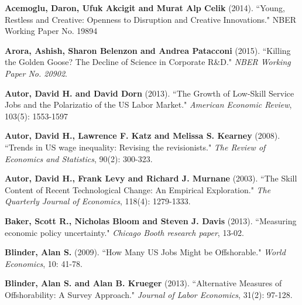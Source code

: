 \documentclass[11pt,a4paper,fleqn]{article}
\begin{document}
\vspace*{0.5cm}
\begin{thebibliography}{9}
	
	 \textbf{Acemoglu, Daron, Ufuk Akcigit and Murat Alp Celik} (2014). ``Young, Restless and Creative: Openness to Disruption and Creative Innovations." NBER Working Paper No. 19894

	 \textbf{Arora, Ashish, Sharon Belenzon and Andrea Patacconi} (2015). ``Killing the Golden Goose? The Decline of Science in Corporate R\&D." \textit{NBER Working Paper No. 20902}.
	
	 \textbf{Autor, David H. and David Dorn} (2013). ``The Growth of Low-Skill Service Jobs and the Polarizatio of the US Labor Market." \textit{American Economic Review}, 103(5): 1553-1597
	
	 \textbf{Autor, David H., Lawrence F. Katz and Melissa S. Kearney} (2008). ``Trends in US wage inequality: Revising the revisionists." \textit{The Review of Economics and Statistics}, 90(2): 300-323.
	
	 \textbf{Autor, David H., Frank Levy and Richard J. Murnane} (2003). ``The Skill Content of Recent Technological Change: An Empirical Exploration." \textit{The Quarterly Journal of Economics}, 118(4): 1279-1333.
	
	 \textbf{Baker, Scott R., Nicholas Bloom and Steven J. Davis} (2013). ``Measuring economic policy uncertainty." \textit{Chicago Booth research paper}, 13-02.
	
	
	 \textbf{Blinder, Alan S.} (2009). ``How Many US Jobs Might be Offshorable." \textit{World Economics}, 10: 41-78.
	
	 \textbf{Blinder, Alan S. and Alan B. Krueger} (2013). ``Alternative Measures of Offshorability: A Survey Approach." \textit{Journal of Labor Economics}, 31(2): 97-128.
	

\end{thebibliography}
\end{document}
